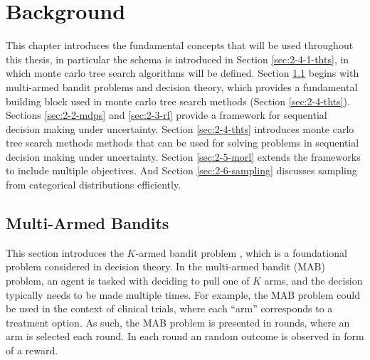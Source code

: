 

\chapter{\label{ch:2-background}Background}

    \minitoc

    This chapter introduces the fundamental concepts that will be used throughout this thesis, in particular the \thtspp\ewe schema is introduced in Section \ref{sec:2-4-1-thts}, in which monte carlo tree search algorithms will be defined. Section \ref{sec:2-1-mab} begins with multi-armed bandit problems and decision theory, which provides a fundamental building block used in monte carlo tree search methods (Section \ref{sec:2-4-thts}). Sections \ref{sec:2-2-mdps} and \ref{sec:2-3-rl} provide a framework for sequential decision making under uncertainty. Section \ref{sec:2-4-thts} introduces monte carlo tree search methods methods that can be used for solving problems in sequential decision making under uncertainty. Section \ref{sec:2-5-morl} extends the frameworks to include multiple objectives. And Section \ref{sec:2-6-sampling} discusses sampling from categorical distributions efficiently.













\section{Multi-Armed Bandits}
\label{sec:2-1-mab}

    This section introduces the $K$-armed bandit problem \cite{mab_og}, which is a foundational problem considered in decision theory. In the multi-armed bandit (MAB) problem, an agent is tasked with deciding to pull one of $K$ arms, and the decision typically needs to be made multiple times. For example, the MAB problem could be used in the context of clinical trials, where each ``arm'' corresponds to a treatment option. As such, the MAB problem is presented in rounds, where an arm is selected each round. In each round an random outcome is observed in form of a reward.

